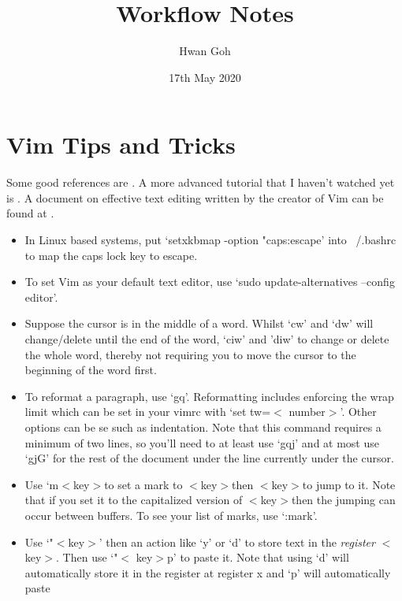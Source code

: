 \documentclass[10pt]{article}
\title{Workflow Notes}
\author{Hwan Goh}
\date{17th May 2020}
\newcommand{\tlangle}{$<$}
\newcommand{\trangle}{$>$}
\begin{document}
\maketitle

\section{Vim Tips and Tricks}
Some good references are \cite{chang2018vim,toomey2015mastering}. A more
advanced tutorial that I haven't watched yet is \cite{chang2020vim}. A document
on effective text editing written by the creator of Vim can be found at
\cite{moolenaar2000seven}.
\begin{itemize}
    \item In Linux based systems, put `setxkbmap -option "caps:escape' into
        ~/.bashrc to map the caps lock key to escape.
    \item To set Vim as your default text editor, use `sudo update-alternatives
        --config editor'.  \item Suppose the cursor is in the middle of a word.
        Whilst `cw' and `dw' will change/delete until the end of the word, `ciw'
        and 'diw' to change or delete the whole word, thereby not requiring you
        to move the cursor to the beginning of the word first.
    \item To reformat a paragraph, use `gq'. Reformatting includes enforcing the
        wrap limit which can be set in your vimrc with `set tw=\tlangle
        number\trangle'. Other options can be se such as indentation. Note that
        this command requires a minimum of two lines, so you'll need to at least
        use `gqj' and at most use `gjG' for the rest of the document under the
        line currently under the cursor.
    \item Use `m\tlangle key\trangle to set a mark to \tlangle key\trangle then
        \tlangle key\trangle to jump to it.  Note that if you set it to the
        capitalized version of \tlangle key\trangle then the jumping can occur
        between buffers. To see your list of marks, use `:mark'.
    \item Use `"\tlangle key\trangle' then an action like `y' or `d' to store
        text in the \textit{register} \tlangle key\trangle. Then use `"\tlangle
        key\trangle p' to paste it. Note that using `d' will automatically store
        it in the register at register x and `p' will automatically paste

\end{itemize}
\end{document}
